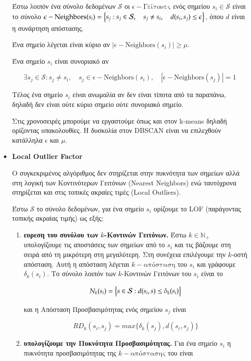\documentclass[a4paper,12pt]{report}
\theoremstyle{definitionNODot}
\begin{document}
\begin{itemize}
		Έστω λοιπόν ένα σύνολο δεδομένων $\mathcal{S}$ οι $\epsilon-\text{Γείτονες}$ ενός σημείου $s_i\in\mathcal{S}$ είναι το σύνολο $\epsilon-\text{Neighbors}(s_i) = \Bigl \{s_j : s_j\in\mathcal{S}, \quad s_j\neq s_i, \quad d(s_i,s_j)\leq \epsilon \Bigl \} $, όπου $d$ είναι η συνάρτηση απόστασης.
		
		Ένα σημείο λέγεται είναι κύριο αν $| \epsilon-\text{Neighbors}(s_i) | \geq \mu$.
		
		Ένα σημείο $s_i$ είναι συνοριακό αν 
		
		$$ \exists s_j \in \mathcal{S} : s_j\neq s_i, \quad s_j \in \epsilon-\text{Neighbors}(s_i), \quad | \epsilon-\text{Neighbors}(s_j) | = 1 $$  
		
		Τέλος ένα σημείο $s_i$ είναι ανωμαλία αν δεν είναι τίποτα από τα παραπάνω, δηλαδή δεν είναι ούτε κύριο σημείο ούτε συνοριακό σημείο.
		
		Στις χρονοσειρές μπορούμε να εργαστούμε όπως και στον k-means δηλαδή ορίζοντας υπακολουθίες. Η δυσκολία στον DBSCAN είναι να επιλεχθούν κατάλληλα $\epsilon$ και $\mu$.
		
		\item \textbf{Local Outlier Factor}
		
		Ο συγκεκριμένος αλγόριθμος δεν στηρίζεται στην πυκνότητα των σημείων αλλά στη λογική των Κοντινότερων Γειτόνων (Nearest Neighbors) ενώ ταυτόχρονα στηρίζεται και στις τοπικές ακραίες τιμές (Local Outliers).
		
		Έστω $\mathcal{S}$ το σύνολο δεδομένων, για ένα σημείο $s_i$ ορίζουμε το LOF (παράγοντας τοπικής ακραίας τιμής) ως εξής:
		
		\begin{enumerate}
			\item \textbf{ευρεση του συνόλου των $k$-Κοντινών Γειτόνων.} Έστω $k\in \mathbb{N}_+$ υπολογίζουμε τις αποστάσεις των σημείων από το $s_i$ και τις βάζουμε στη σειρά από τη μικρότερη στη μεγαλύτερη. Στη συνέχεια επιλέγουμε την $k$-οστή απόσταση. Αυτή η απόσταση λέγεται $k-\text{απόσταση}$ του $s_i$ και γράφουμε $\delta_k(s_i)$. Το σύνολο λοιπόν των $k$-Κοντινών Γειτόνων του $s_i$ είναι το
			
			$$N_k(s_i) = \Bigl \{ s \in \mathcal{S} : d(s_i,s) \leq \delta_k(s_i) \Bigl \} $$
			
			και η Απόσταση Προσβασιμότητας ενός σημείου $s_j$ είναι 
			
			$$ RD_k(s_i,s_j) = max\{ \delta_k(s_j), d(s_i,s_j) \} $$
			
			\item \textbf{υπολογίζουμε την Πυκνότητα Προσβασιμότητας.} Για ένα σημείο $s_i$ η πυκνότητα προσβασιμότητας της $k-\text{απόστασης}$ του είναι
			

\end{enumerate}
\end{itemize}
\end{document}
